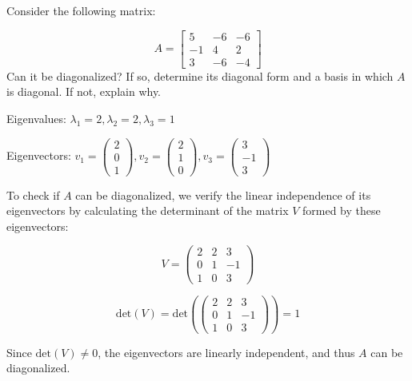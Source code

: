 \documentclass{exam}
\begin{document}
\begin{questions}
\begin{solution}
\end{solution}

\question[3]
Consider the following matrix:

$$ A = \left[\begin{array}{rrr} 5 & -6 & -6 \\
                               -1 & 4 & 2 \\
                                3 & -6 & -4 \end{array}\right]$$
\vspace{0.25cm}
\noindent
Can it be diagonalized? If so, determine its diagonal form and a basis in which $A$ is diagonal. If not, explain why.

\begin{solution}

Eigenvalues: \( \lambda_1 = 2, \lambda_2 = 2, \lambda_3 = 1 \)

Eigenvectors: \( v_1 = \begin{pmatrix} 2 \\ 0 \\ 1 \end{pmatrix}, v_2 = \begin{pmatrix} 2 \\ 1 \\ 0 \end{pmatrix}, v_3 = \begin{pmatrix} 3 \\ -1 \\ 3 \end{pmatrix} \)

To check if \( A \) can be diagonalized, we verify the linear independence of its eigenvectors by calculating the determinant of the matrix \( V \) formed by these eigenvectors:

\[ V = \begin{pmatrix} 2 & 2 & 3 \\ 0 & 1 & -1 \\ 1 & 0 & 3 \end{pmatrix} \]

\[ \text{det}(V) = \text{det}\left( \begin{pmatrix} 2 & 2 & 3 \\ 0 & 1 & -1 \\ 1 & 0 & 3 \end{pmatrix} \right) = 1 \]

Since \( \text{det}(V) \neq 0 \), the eigenvectors are linearly independent, and thus \( A \) can be diagonalized.
\end{solution}


\end{questions}
\end{document}
